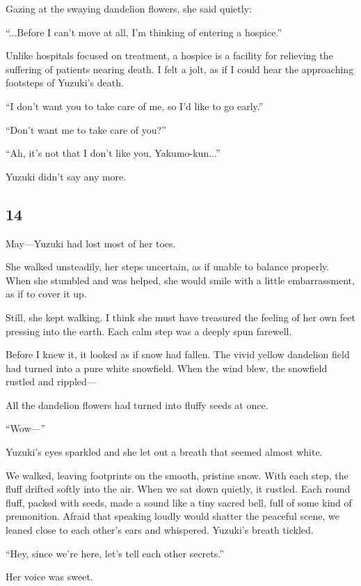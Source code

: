\documentclass[
    a4paper,
    12pt,
    twoside,
    openany,
    UTF8,
    fontset=windows
]{ctexbook}
\begin{document}
Gazing at the swaying dandelion flowers, she said quietly:

``...Before I can't move at all, I'm thinking of entering a hospice.''

Unlike hospitals focused on treatment, a hospice is a facility for relieving the suffering of patients nearing death. I felt a jolt, as if I could hear the approaching footsteps of Yuzuki's death.

``I don't want you to take care of me, so I'd like to go early.''

``Don't want me to take care of you?''

``Ah, it's not that I don't like you, Yakumo-kun...''

Yuzuki didn't say any more.


\subsection*{14}

May---Yuzuki had lost most of her toes.

She walked unsteadily, her steps uncertain, as if unable to balance properly. When she stumbled and was helped, she would smile with a little embarrassment, as if to cover it up.

Still, she kept walking. I think she must have treasured the feeling of her own feet pressing into the earth. Each calm step was a deeply spun farewell.

Before I knew it, it looked as if snow had fallen. The vivid yellow dandelion field had turned into a pure white snowfield. When the wind blew, the snowfield rustled and rippled---

All the dandelion flowers had turned into fluffy seeds at once.

``Wow---''

Yuzuki's eyes sparkled and she let out a breath that seemed almost white.

We walked, leaving footprints on the smooth, pristine snow. With each step, the fluff drifted softly into the air. When we sat down quietly, it rustled. Each round fluff, packed with seeds, made a sound like a tiny sacred bell, full of some kind of premonition. Afraid that speaking loudly would shatter the peaceful scene, we leaned close to each other's ears and whispered. Yuzuki's breath tickled.

``Hey, since we're here, let's tell each other secrets.''

Her voice was sweet.
\end{document}
